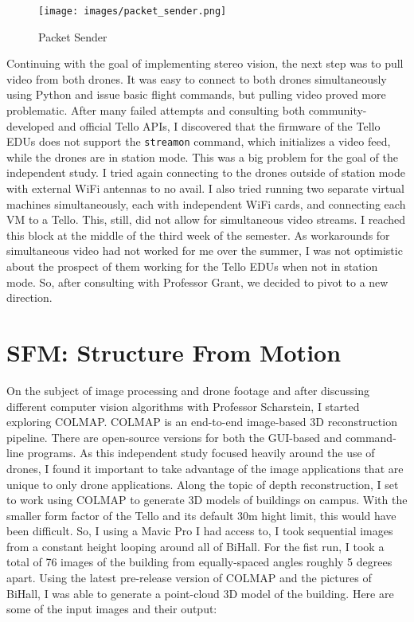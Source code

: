 \begin{figure}[htbp]
\centering
\texttt{[image: images/packet\_sender.png]}
\caption{Packet Sender}
\end{figure}

Continuing with the goal of implementing stereo vision, the next step was to pull video from both drones. It was easy to connect to both drones simultaneously using Python and issue basic flight commands, but pulling video proved more problematic. After many failed attempts and consulting both community-developed and official Tello APIs, I discovered that the firmware of the Tello EDUs does not support the \texttt{streamon} command, which initializes a video feed, while the drones are in station mode. This was a big problem for the goal of the independent study. I tried again connecting to the drones outside of station mode with external WiFi antennas to no avail. I also tried running two separate virtual machines simultaneously, each with independent WiFi cards, and connecting each VM to a Tello. This, still, did not allow for simultaneous video streams. I reached this block at the middle of the third week of the semester. As workarounds for simultaneous video had not worked for me over the summer, I was not optimistic about the prospect of them working for the Tello EDUs when not in station mode. So, after consulting with Professor Grant, we decided to pivot to a new direction.

\chapter{SFM: Structure From Motion}
\label{sfm:structurefrommotion}

On the subject of image processing and drone footage and after discussing different computer vision algorithms with Professor Scharstein, I started exploring COLMAP. COLMAP is an end-to-end image-based 3D reconstruction pipeline. There are open-source versions for both the GUI-based and command-line programs. As this independent study focused heavily around the use of drones, I found it important to take advantage of the image applications that are unique to only drone applications. Along the topic of depth reconstruction, I set to work using COLMAP to generate 3D models of buildings on campus. With the smaller form factor of the Tello and its default 30m hight limit, this would have been difficult. So, I using a Mavic Pro I had access to, I took sequential images from a constant height looping around all of BiHall. For the fist run, I took a total of 76 images of the building from equally-spaced angles roughly 5 degrees apart. Using the latest pre-release version of COLMAP and the pictures of BiHall, I was able to generate a point-cloud 3D model of the building. Here are some of the input images and their output:


